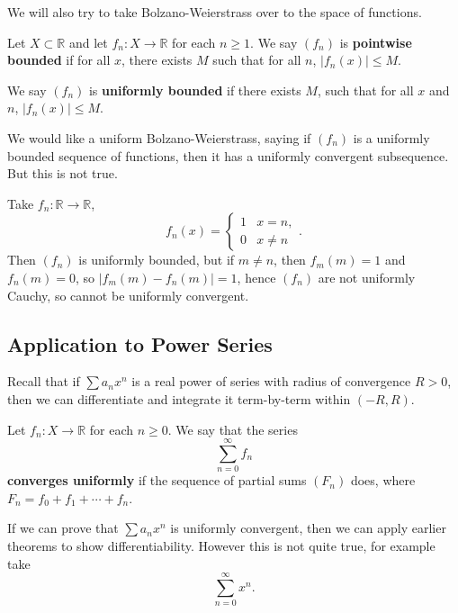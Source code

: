 \documentclass[12pt]{article}
\begin{document}
We will also try to take Bolzano-Weierstrass over to the space of functions.

\begin{definition}
	Let $X \subset \mathbb{R}$ and let $f_n : X \to \mathbb{R}$ for each $n \geq 1$. We say $(f_n)$ is \textbf{pointwise bounded} if for all $x$, there exists $M$ such that for all $n$, $|f_n(x)| \leq M$.

	We say $(f_n)$ is \textbf{uniformly bounded} if there exists $M$, such that for all $x$ and $n$, $|f_n(x)| \leq M$.
\end{definition}

We would like a uniform Bolzano-Weierstrass, saying if $(f_n)$ is a uniformly bounded sequence of functions, then it has a uniformly convergent subsequence. But this is not true.

\begin{exbox}
	Take $f_n : \mathbb{R} \to \mathbb{R}$, 
	\[
		f_n(x) =
		\begin{cases}
			1 & x = n,\\
			0 & x \neq n
		\end{cases}
	.\]
	Then $(f_n)$ is uniformly bounded, but if $m \neq n$, then $f_m(m) = 1$ and $f_n(m) = 0$, so $|f_m(m) - f_n(m)| = 1$, hence $(f_n)$ are not uniformly Cauchy, so cannot be uniformly convergent.
\end{exbox}

\subsection{Application to Power Series}%
\label{sub:application_to_power_series}

Recall that if $\sum a_n x^{n}$ is a real power of series with radius of convergence $R > 0$, then we can differentiate and integrate it term-by-term within $(-R, R)$.

\begin{definition}
	Let $f_n : X \to \mathbb{R}$ for each $n \geq 0$. We say that the series
	\[
	\sum_{n = 0}^{\infty}f_n
	\]
	\textbf{converges uniformly} if the sequence of partial sums $(F_n)$ does, where $F_n = f_0 + f_1 + \cdots + f_n$.
\end{definition}

If we can prove that $\sum a_n x^{n}$ is uniformly convergent, then we can apply earlier theorems to show differentiability. However this is not quite true, for example take
\[
\sum_{n = 0}^{\infty} x^{n}
.\]
\end{document}
